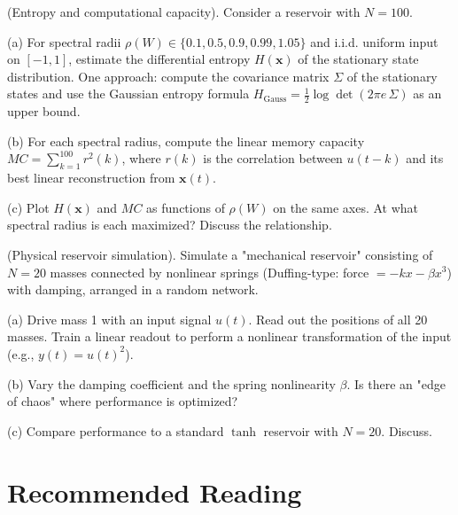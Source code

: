 \begin{exercise}
(Entropy and computational capacity). Consider a reservoir with $N = 100$.

(a) For spectral radii $\rho(W) \in \{0.1, 0.5, 0.9, 0.99, 1.05\}$ and i.i.d. uniform input on $[-1,1]$, estimate the differential entropy $H(\mathbf{x})$ of the stationary state distribution. One approach: compute the covariance matrix $\Sigma$ of the stationary states and use the Gaussian entropy formula $H_{\text{Gauss}} = \frac{1}{2} \log \det(2\pi e \, \Sigma)$ as an upper bound.

(b) For each spectral radius, compute the linear memory capacity $MC = \sum_{k=1}^{100} r^2(k)$, where $r(k)$ is the correlation between $u(t-k)$ and its best linear reconstruction from $\mathbf{x}(t)$.

(c) Plot $H(\mathbf{x})$ and $MC$ as functions of $\rho(W)$ on the same axes. At what spectral radius is each maximized? Discuss the relationship.
\end{exercise}


\begin{exercise}
(Physical reservoir simulation). Simulate a "mechanical reservoir" consisting of $N = 20$ masses connected by nonlinear springs (Duffing-type: force $= -kx - \beta x^3$) with damping, arranged in a random network.

(a) Drive mass 1 with an input signal $u(t)$. Read out the positions of all 20 masses. Train a linear readout to perform a nonlinear transformation of the input (e.g., $y(t) = u(t)^2$).

(b) Vary the damping coefficient and the spring nonlinearity $\beta$. Is there an "edge of chaos" where performance is optimized?

(c) Compare performance to a standard $\tanh$ reservoir with $N = 20$. Discuss.


\bigskip

\end{exercise}


\section*{Recommended Reading}

